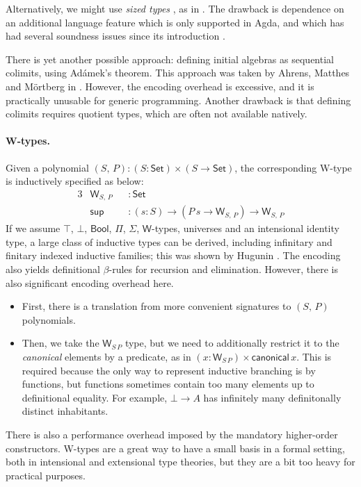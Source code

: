 \documentclass[12pt,a4paper,twoside,openany]{book}
\theoremstyle{remark}
\theoremstyle{definition}
\theoremstyle{theorem}
\newcommand{\ms}[1]{\mathsf{#1}}
\newcommand{\Set}{\mathsf{Set}}
\newcommand{\Bool}{\ms{Bool}}
\begin{document}
Alternatively, we might use \emph{sized types} \cite{abel17normalization}, as
in \cite{allais20type}. The drawback is dependence on an additional
language feature which is only supported in Agda, and which has had several
soundness issues since its introduction \cite{TODO}.

There is yet another possible approach: defining initial algebras as sequential
colimits, using Adámek's theorem. This approach was taken by Ahrens, Matthes and
Mörtberg in \cite{ahrens19from}. However, the encoding overhead is excessive,
and it is practically unusable for generic programming. Another drawback is that
defining colimits requires quotient types, which are often not available
natively.

\paragraph{W-types.} Given a polynomial $(S,\,P) : (S : \Set) \times (S \to \Set)$,
the corresponding W-type is inductively specified as below:
\begin{alignat*}{3}
  & \ms{W}_{S,\,P} &&: \Set \\
  & \ms{sup} &&: (s : S) \to (P\,s \to \ms{W}_{S,\,P}) \to \ms{W}_{S,\,P}
\end{alignat*}
If we assume $\top$, $\bot$, $\Bool$, $\Pi$, $\Sigma$, $\ms{W}$-types, universes
and an intensional identity type, a large class of inductive types can be
derived, including infinitary and finitary indexed inductive families; this
was shown by Hugunin \cite{whynotw}. The encoding also yields definitional
$\beta$-rules for recursion and elimination. However, there is also significant
encoding overhead here.
\begin{itemize}
  \item
    First, there is a translation from more convenient signatures to $(S,\,P)$ polynomials.
  \item Then, we take the $\ms{W}_{S\,P}$ type, but we need to additionally
    restrict it to the \emph{canonical} elements by a predicate, as in $(x :
    \ms{W}_{S\,P}) \times \ms{canonical}\,x$. This is required because the only
    way to represent inductive branching is by functions, but functions
    sometimes contain too many elements up to definitional equality. For
    example, $\bot \to A$ has infinitely many definitonally distinct
    inhabitants.
\end{itemize}
There is also a performance overhead imposed by the mandatory higher-order
constructors. W-types are a great way to have a small basis in a formal setting,
both in intensional and extensional type theories, but they are a bit too heavy
for practical purposes.
\end{document}
